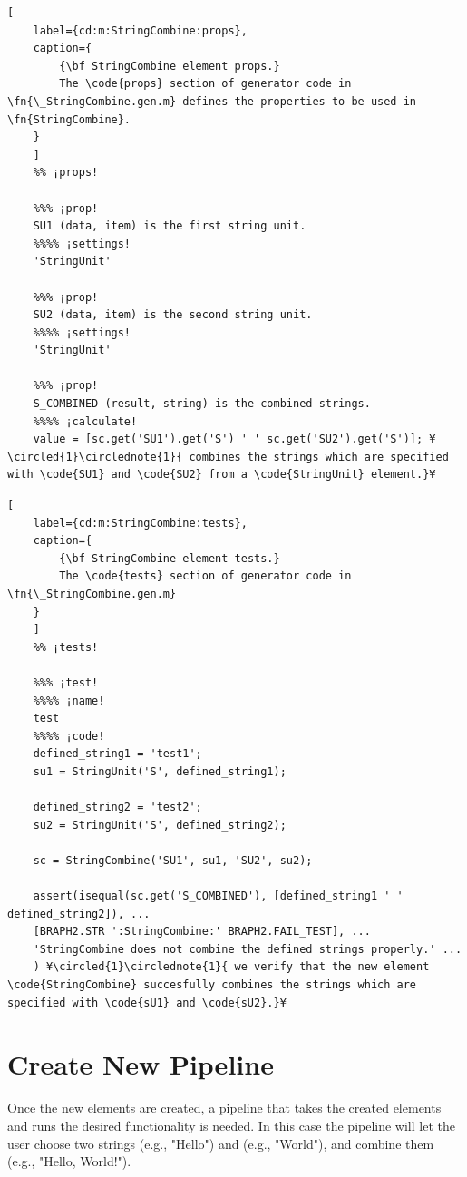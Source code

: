 \documentclass{tufte-handout}
\begin{document}
\begin{lstlisting}[
	label={cd:m:StringCombine:props},
	caption={
		{\bf StringCombine element props.}
		The \code{props} section of generator code in \fn{\_StringCombine.gen.m} defines the properties to be used in \fn{StringCombine}.
	}
	]
	%% ¡props!
	
	%%% ¡prop!
	SU1 (data, item) is the first string unit.
	%%%% ¡settings!
	'StringUnit'
	
	%%% ¡prop!
	SU2 (data, item) is the second string unit.
	%%%% ¡settings!
	'StringUnit'
	
	%%% ¡prop!
	S_COMBINED (result, string) is the combined strings.
	%%%% ¡calculate!
	value = [sc.get('SU1').get('S') ' ' sc.get('SU2').get('S')]; ¥\circled{1}\circlednote{1}{ combines the strings which are specified with \code{SU1} and \code{SU2} from a \code{StringUnit} element.}¥
\end{lstlisting}

\begin{lstlisting}[
	label={cd:m:StringCombine:tests},
	caption={
		{\bf StringCombine element tests.}
		The \code{tests} section of generator code in \fn{\_StringCombine.gen.m}
	}
	]
	%% ¡tests!
	
	%%% ¡test!
	%%%% ¡name!
	test
	%%%% ¡code!
	defined_string1 = 'test1';
	su1 = StringUnit('S', defined_string1);
	
	defined_string2 = 'test2';
	su2 = StringUnit('S', defined_string2);
	
	sc = StringCombine('SU1', su1, 'SU2', su2);
	
	assert(isequal(sc.get('S_COMBINED'), [defined_string1 ' ' defined_string2]), ...
	[BRAPH2.STR ':StringCombine:' BRAPH2.FAIL_TEST], ...
	'StringCombine does not combine the defined strings properly.' ...
	) ¥\circled{1}\circlednote{1}{ we verify that the new element \code{StringCombine} succesfully combines the strings which are specified with \code{sU1} and \code{sU2}.}¥
\end{lstlisting}

\clearpage

\section{Create New Pipeline}

Once the new elements are created, a pipeline that takes the created elements and runs the desired functionality is needed. In this case the pipeline will let the user choose two strings (e.g., "Hello") and (e.g., "World"), and combine them (e.g., "Hello, World!").
\end{document}
